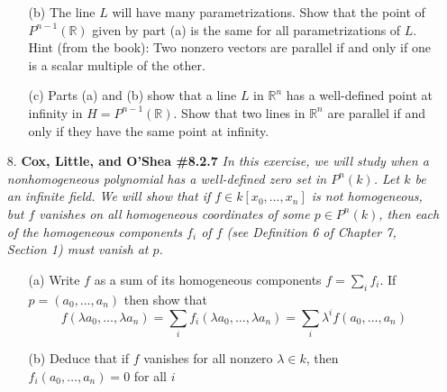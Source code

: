 \documentclass[12pt]{article}
\newcommand{\R}{\mathbb{R}}
\begin{document}
\begin{enumerate}
\begin{enumerate}
    \item[(b)] The line $L$ will have many parametrizations. Show that the point of $P^{n-1}(\R)$ given by part (a) is the same for all parametrizations of $L$. Hint (from the book): Two nonzero vectors are parallel if and only if one is a scalar multiple of the other.

    \item[(c)]  Parts (a) and (b) show that a line $L$ in $\R^n$ has a well-defined point at infinity in $H = P^{n-1}(\R)$. Show that two lines in $\R^n$ are parallel if and only if they have the same point at infinity.
\end{enumerate}


\item[8.] \textbf{Cox, Little, and O'Shea \#8.2.7} \textit{In this exercise, we will study when a nonhomogeneous polynomial has a well-defined zero set in $P^n(k)$. Let $k$ be an infinite field. We will show that if $f\in k[x_0,..., x_n]$ is not homogeneous, but $f$ vanishes on all homogeneous coordinates of some $p\in P^n(k)$, then each of the homogeneous components $f_i$ of $f$ (see Definition 6 of Chapter 7, Section 1) must vanish at $p$.}

\begin{enumerate}
    \item[(a)] Write $f$ as a sum of its homogeneous components $f = \sum_i f_i$. If $p = (a_0,\ldots,a_n)$ then show that
    \[
    f(\lambda a_0,\ldots, \lambda a_n) = \sum_i f_i(\lambda a_0,\ldots, \lambda a_n) = \sum_i \lambda^i f(a_0,\ldots, a_n)
    \]

    \item[(b)] Deduce that if $f$ vanishes for all nonzero $\lambda\in k$, then $f_i(a_0,\ldots,a_n)=0$ for all $i$
\end{enumerate}

\end{enumerate}
\end{document}
